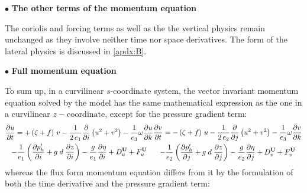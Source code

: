 \documentclass[../main/NEMO_manual]{subfiles}
\begin{document}
$\bullet$ \textbf{The other terms of the momentum equation}

The coriolis and forcing terms as well as the the vertical physics remain unchanged as
they involve neither time nor space derivatives.
The form of the lateral physics is discussed in \autoref{apdx:B}.

$\bullet$ \textbf{Full momentum equation}

To sum up, in a curvilinear $s$-coordinate system,
the vector invariant momentum equation solved by the model has the same mathematical expression as
the one in a curvilinear $z-$coordinate, except for the pressure gradient term:
\begin{subequations}
  \label{apdx:A_dyn_vect}
  \begin{multline}
    \label{apdx:A_PE_dyn_vect_u}
    \frac{\partial u}{\partial t}=
    +   \left( {\zeta +f} \right)\,v
    -   \frac{1}{2\,e_1} \frac{\partial}{\partial i} \left(  u^2+v^2   \right)
    -   \frac{1}{e_3} \omega \frac{\partial u}{\partial k}       \\
    -   \frac{1}{e_1 } \left(    \frac{\partial p_h'}{\partial i} + g\; d  \; \frac{\partial z}{\partial i}    \right)
    -   \frac{g}{e_1 } \frac{\partial \eta}{\partial i}
    +   D_u^{\vect{U}}  +   F_u^{\vect{U}}
  \end{multline}
  \begin{multline}
    \label{apdx:A_dyn_vect_v}
    \frac{\partial v}{\partial t}=
    -   \left( {\zeta +f} \right)\,u
    -   \frac{1}{2\,e_2 }\frac{\partial }{\partial j}\left(  u^2+v^2  \right)
    -   \frac{1}{e_3 } \omega \frac{\partial v}{\partial k}         \\
    -   \frac{1}{e_2 } \left(    \frac{\partial p_h'}{\partial j} + g\; d  \; \frac{\partial z}{\partial j}    \right)
    -   \frac{g}{e_2 } \frac{\partial \eta}{\partial j}
    +  D_v^{\vect{U}}  +   F_v^{\vect{U}}
  \end{multline}
\end{subequations}
whereas the flux form momentum equation differs from it by
the formulation of both the time derivative and the pressure gradient term:
\end{document}
